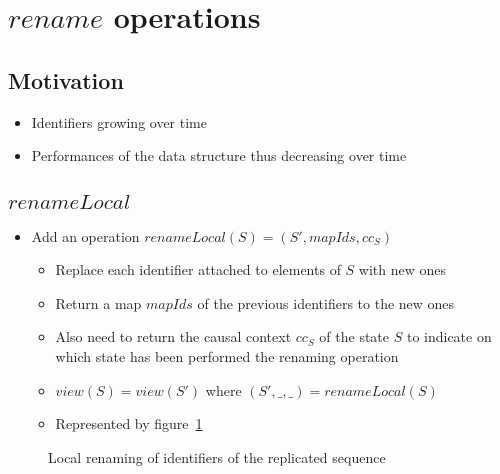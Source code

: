 \documentclass[a4paper]{article}
\newcommand{\numToText}[1]{%
  \ifcase#1\or one\or two\or three\or four\or five\or six\or seven\or eight\or nine\or ten\or
    eleven\or twelve\or thirteen\or fourteen\or fifteen\or sixteen\or seventeen\or eighteen\or nineteen\or twenty\or Lots
  \fi
}
\newcommand{\drawState}[6] {
  \node[#2=1pt of #1] {#3};
  \node[#2=11pt of #1] {#4};
  \node[#2=30pt of #1] {#5};

  \def \logcontents{}
  \foreach[count=\counter] \remote/\local in {#6} {
    \xappto{\logcontents}{
      \noexpand
      \nodepart{\numToText{\counter}}
      $remoteOp_\remote$ $localOp_\local$
    }
  }
  \node[#2=45pt of #1,
    scale=0.75,
    text width=2cm,
    align=center,
    draw,
    rectangle split,
    rectangle split horizontal,
    rectangle split parts=\counter] {
    \logcontents
  };
}
\begin{document}
\section{$rename$ operations}

\subsection{Motivation}

\begin{itemize}
  \item Identifiers growing over time
  \item Performances of the data structure thus decreasing over time
\end{itemize}

\subsection{$renameLocal$}

\begin{itemize}
  \item Add an operation $renameLocal(S) = (S', mapIds, cc_S)$
  \begin{itemize}
    \item Replace each identifier attached to elements of $S$ with new ones
    \item Return a map $mapIds$ of the previous identifiers to the new ones
    \item Also need to return the causal context $cc_S$ of the state $S$
      to indicate on which state has been performed the renaming operation
    \item $view(S) = view(S')$ where $(S', \_, \_) = renameLocal(S)$
    \item Represented by figure~\ref{renameLocal}
  \end{itemize}
\end{itemize}

\begin{figure}[h]
  \caption{Local renaming of identifiers of the replicated sequence}
  \label{renameLocal}
\end{figure}
\end{document}
